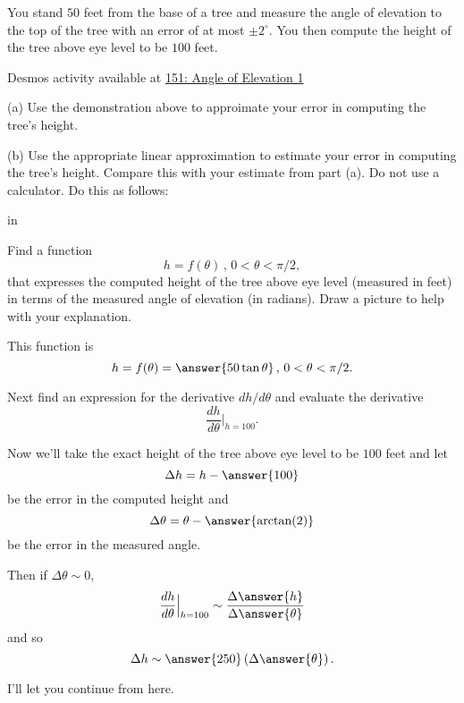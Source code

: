 \documentclass{ximera}
\newcommand{\pskip}{\vskip 0.1 in}
\begin{document}
\begin{question}  \label{Q:defr4gg4t}
You stand $50$ feet from the base of a tree and measure the angle of elevation to the top of the tree with an error of at most $\pm 2^\circ$. You then compute the height of the tree above eye level to be $100$ feet. 

\begin{onlineOnly}
    \begin{center}
\end{center}
\end{onlineOnly}

Desmos activity available at \href{https://www.desmos.com/calculator/yjyghsoeog}{151: Angle of Elevation 1}

(a) Use the demonstration above to approimate your error in computing the tree's height.  

(b) Use the appropriate linear approximation to estimate your error in computing the tree's height. Compare this with your estimate from part (a). Do not use a calculator. Do this as follows:

\pskip 

\begin{itemize}

\item{Find a function
\[
    h = f(\theta) \, , \, 0<\theta < \pi/2 ,
\]
that expresses the computed height of the tree above eye level (measured in feet) in terms of the measured angle of elevation (in radians). Draw a picture to help with your explanation.

This function is
\[
   h = f(\theta) = \answer{50\tan\theta} \, , \, 0<\theta < \pi/2 .
\]
}

\item{Next find an expression for the derivative $dh/d\theta$ and evaluate the derivative
\[
     \frac{dh}{d\theta}\Big|_{h=100} .
\]
}

\item{Now we'll take the exact height of the tree above eye level to be $100$ feet and let
\[
     \Delta h = h -  \answer{100}
\]
be the error in the computed height and 
\[
   \Delta \theta = \theta - \answer{\arctan(2)}
\]
be the error in the measured angle.

Then if $\Delta\theta \sim 0$, 
\[
      \frac{dh}{d\theta}\Big|_{h=100} \sim \frac{\Delta \answer{h}}{\Delta \answer {\theta}}
\]
and so
\[
     \Delta h \sim \answer{250} \left( \Delta {\answer{\theta}} \right) .
\]

\item{I'll let you continue from here.}
 }
\end{itemize}
\end{question}
\end{document}
